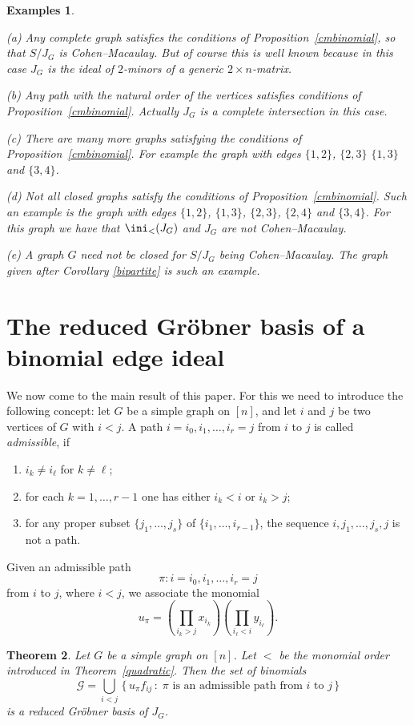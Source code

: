 \documentclass[11pt]{amsart}
\let\Union=\bigcup
\newtheorem{Theorem}{Theorem}[section]
\newtheorem{Examples}[Theorem]{Examples}
\begin{document}
\begin{Examples}
\label{cmexamples}
{\em (a) Any complete graph satisfies the conditions  of Proposition~\ref{cmbinomial}, so that $S/J_G$ is Cohen--Macaulay. But of course this is well known because in this case $J_G$ is the ideal of $2$-minors of a generic $2\times n$-matrix.

(b) Any path with the natural order of the vertices satisfies conditions  of Proposition~\ref{cmbinomial}. Actually $J_G$ is a complete intersection in this case.

(c) There are many more graphs satisfying the conditions of Proposition~\ref{cmbinomial}. For example the graph with edges $\{1,2\}$, $\{2,3\}$ $\{1,3\}$ and $\{3,4\}$.

(d) Not all closed graphs satisfy the conditions of Proposition~\ref{cmbinomial}. Such an example is the graph with edges $\{1,2\}$, $\{1,3\}$,  $\{2,3\}$, $\{2,4\}$ and $\{3,4\}$. For this graph we have that  $\ini_<(J_G)$ and $J_G$ are  not Cohen--Macaulay.

(e) A graph $G$ need not be closed for $S/J_G$ being Cohen--Macaulay. The  graph given after Corollary \ref{bipartite}  is such an example. }
\end{Examples}



\section{The reduced Gr\"obner basis of a binomial edge ideal}
We now come to the main result of this paper.
For this we need to introduce the following concept:
let $G$ be a simple graph on $[n]$,
and let $i$ and $j$ be two vertices of $G$ with $i<j$.
A path $i=i_0,i_1,\ldots,i_r=j$ from $i$ to $j$
is called {\em admissible}, if
\begin{enumerate}
\item[(i)] $i_k\neq i_\ell$  for $k\neq \ell$;
\item[(ii)] for each $k=1,\ldots,r-1$ one has either $i_k<i$ or $i_k>j$;
\item[(iii)] for any proper subset $\{j_1,\ldots,j_s\}$
of $\{i_1,\ldots,i_{r-1}\}$, the sequence $i,j_1,\ldots,j_s,j$
is not a path.
\end{enumerate}
Given an admissible path
\[
\pi: i=i_0,i_1,\ldots,i_r=j
\]
from $i$ to $j$, where $i < j$, we associate the monomial
\[
u_{\pi}=(\prod_{i_k>j}x_{i_k}) (\prod_{i_\ell<i}y_{i_\ell}).
\]

\begin{Theorem}
\label{mainresult}
Let $G$ be a simple graph on $[n]$. Let $<$ be the monomial order introduced in Theorem~\ref{quadratic}. Then the set of binomials
\[
{\mathcal G}
= \Union_{i<j} \,
\{\,u_{\pi}f_{ij}\,:\;\text{$\pi$ is an admissible path from $i$ to $j$}\,\}
\]
is a reduced Gr\"obner basis of $J_G$.
\end{Theorem}
\end{document}
